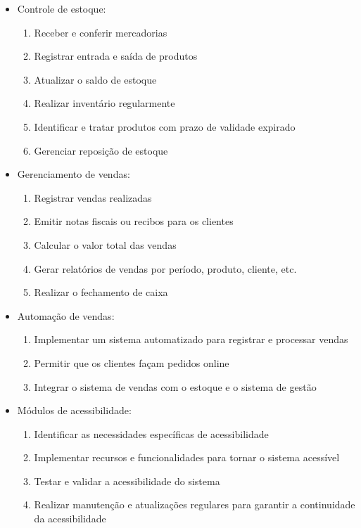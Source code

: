 \documentclass[
	12pt,				%
	openright,			%
	twoside,			%
	a4paper,			%
	english,			%
	brazil				%
	]{abntex2}
\begin{document}
\begin{itemize}
    \item Controle de estoque:
    \begin{enumerate}
        \item Receber e conferir mercadorias
        \item Registrar entrada e saída de produtos
        \item Atualizar o saldo de estoque
        \item Realizar inventário regularmente
        \item Identificar e tratar produtos com prazo de validade expirado
        \item Gerenciar reposição de estoque
    \end{enumerate}
    
    \item Gerenciamento de vendas:
    \begin{enumerate}
        \item Registrar vendas realizadas
        \item Emitir notas fiscais ou recibos para os clientes
        \item Calcular o valor total das vendas
        \item Gerar relatórios de vendas por período, produto, cliente, etc.
        \item Realizar o fechamento de caixa
    \end{enumerate}
    
    \item Automação de vendas:
    \begin{enumerate}
        \item Implementar um sistema automatizado para registrar e processar vendas
        \item Permitir que os clientes façam pedidos online
        \item Integrar o sistema de vendas com o estoque e o sistema de gestão
    \end{enumerate}
    
    \item Módulos de acessibilidade:
    \begin{enumerate}
        \item Identificar as necessidades específicas de acessibilidade
        \item Implementar recursos e funcionalidades para tornar o sistema acessível
        \item Testar e validar a acessibilidade do sistema
        \item Realizar manutenção e atualizações regulares para garantir a continuidade da acessibilidade
    \end{enumerate}
    

\end{itemize}
\end{document}
